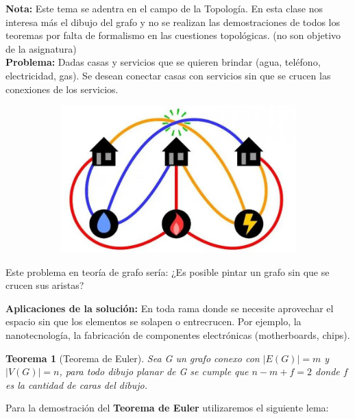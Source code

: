\documentclass[a4paper,1pt]{report}
\newtheorem*{teo}{Teorema}
\begin{document}
\textbf{Nota:} Este tema se adentra en el campo de la Topología. En esta clase nos interesa más el dibujo del grafo y
 no se realizan las demostraciones de todos los teoremas por falta de formalismo en las cuestiones topológicas. (no son objetivo de la asignatura)\\


\textbf{Problema:} Dadas casas y servicios que se quieren brindar (agua, teléfono, electricidad, gas). Se desean
conectar casas con servicios sin que se crucen las conexiones de los servicios.


\begin{figure}[H]
    \centering
    \begin{subfigure}[b]{0.45\textwidth}
        \centering
        \includegraphics[width=\textwidth]{figures5/services.png}
    \end{subfigure}
\end{figure} 

Este problema en teoría de grafo sería: ¿Es posible pintar un grafo sin que se crucen sus aristas?


\textbf{Aplicaciones de la solución:} En toda rama donde se necesite aprovechar el espacio sin que los elementos se
solapen o entrecrucen. Por ejemplo, la nanotecnología, la fabricación de componentes electrónicas
(motherboards, chips).

\begin{teo}[Teorema de Euler]
Sea G un grafo conexo con $|E(G)|=m$  y $|V(G)|=n$, para todo dibujo planar de G se cumple que $n-m+f=2$ donde $f$ es la cantidad de caras del dibujo.
\end{teo}

Para la demostración del \textbf{Teorema de Euler} utilizaremos el siguiente lema:
\end{document}
